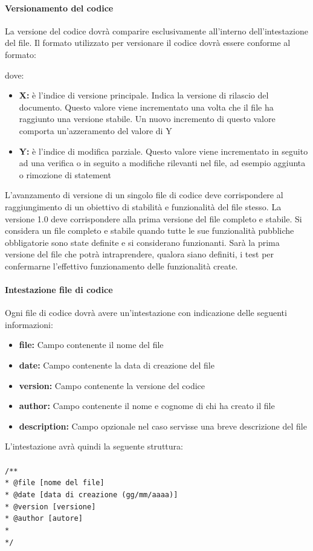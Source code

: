 \documentclass[12pt,a4paper]{article}
\begin{document}
\paragraph{Versionamento del codice}
La versione del codice dovrà comparire esclusivamente all’interno dell’intestazione del file. Il formato utilizzato per versionare il codice dovrà essere conforme al formato:
\begin{center}
\end{center}
dove:
\begin{itemize}
	\item \textbf{X:} è l’indice di versione principale. Indica la versione di rilascio del documento. Questo valore viene incrementato una volta che il file ha raggiunto una versione stabile. Un nuovo incremento di questo valore comporta un'azzeramento del valore di Y
	\item \textbf{Y:} è l’indice di modifica parziale. Questo valore viene incrementato in seguito ad una verifica o in seguito a modifiche rilevanti nel file, ad esempio aggiunta o rimozione di statement
\end{itemize}
L’avanzamento di versione di un singolo file di codice deve corrispondere al raggiungimento di un obiettivo di stabilità e funzionalità del file stesso. La versione 1.0 deve corrispondere alla prima versione del file completo e stabile. Si considera un file completo e stabile quando tutte le sue funzionalità pubbliche obbligatorie sono state definite e si considerano funzionanti. Sarà la prima versione del file che potrà intraprendere, qualora siano definiti, i test per confermarne l’effettivo funzionamento delle funzionalità create.

\paragraph{Intestazione file di codice}
Ogni file di codice dovrà avere un’intestazione con indicazione delle seguenti informazioni:
\begin{itemize}
	\item \textbf{file:} Campo contenente il nome del file
	\item \textbf{date:} Campo contenente la data di creazione del file
	\item \textbf{version:} Campo contenente la versione del codice
	\item \textbf{author:} Campo contenente il nome e cognome di chi ha creato il file
	\item \textbf{description:} Campo opzionale nel caso servisse una breve descrizione del file
\end{itemize}
L'intestazione avrà quindi la seguente struttura:\\\\
\texttt{/**\\
	* @file [nome del file]\\
	* @date [data di creazione (gg/mm/aaaa)]\\
	* @version [versione]\\
	* @author [autore]\\
	*\\
	*/\\
}
\end{document}
